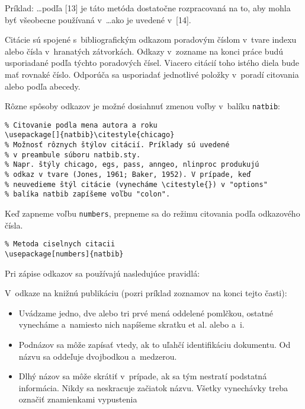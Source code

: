 \medskip

Príklad:
\dots podľa [13] je táto metóda dostatočne rozpracovaná na to, aby
mohla byť všeobecne používaná v~\dots ako je uvedené v~[14].

\medskip

Citácie sú spojené s~bibliografickým odkazom poradovým číslom v~tvare
indexu alebo čísla v~hranatých zátvorkách. Odkazy v~zozname na konci
práce budú usporiadané podľa týchto poradových čísel. Viacero citácií
toho istého diela bude mať rovnaké číslo. Odporúča sa usporiadať
jednotlivé položky v~poradí citovania alebo podľa abecedy.

\medskip
\noindent
Rôzne spôsoby odkazov je možné dosiahnuť zmenou voľby v~balíku
\verb+natbib+:

\noindent
\verb+% Citovanie podla mena autora a roku+\\
\verb+\usepackage[]{natbib}\citestyle{chicago}+\\
\verb+% Možnosť rôznych štýlov citácií. Príklady sú uvedené+\\
\verb+% v preambule súboru natbib.sty.+\\
\verb+% Napr. štýly chicago, egs, pass, anngeo, nlinproc produkujú+\\
\verb+% odkaz v tvare (Jones, 1961; Baker, 1952). V prípade, keď+\\
\verb+% neuvedieme štýl citácie (vynecháme \citestyle{}) v "options"+\\
\verb+% balíka natbib zapíšeme voľbu "colon".+

\medskip
\noindent
Keď zapneme voľbu \verb+numbers+, prepneme sa do režimu citovania
podľa odkazového čísla.

\noindent
\verb+% Metoda ciselnych citacii+\\
\verb+\usepackage[numbers]{natbib}+

\bigskip

Pri zápise odkazov sa používajú nasledujúce pravidlá:

V~odkaze na knižnú publikáciu (pozri príklad zoznamov na konci tejto
časti):
\begin{itemize}
\item Uvádzame jedno, dve alebo tri prvé mená oddelené pomlčkou,
ostatné vynecháme a~namiesto nich napíšeme skratku et al. alebo a~i.
\item Podnázov sa môže zapísať vtedy, ak to uľahčí identifikáciu
dokumentu. Od názvu sa oddeľuje dvojbodkou a~medzerou.
\item Dlhý názov sa môže skrátiť v~prípade, ak sa tým nestratí
podstatná informácia. Nikdy sa neskracuje začiatok názvu. Všetky
vynechávky treba označiť znamienkami vypustenia  \uv{\dots}
\end{itemize}


